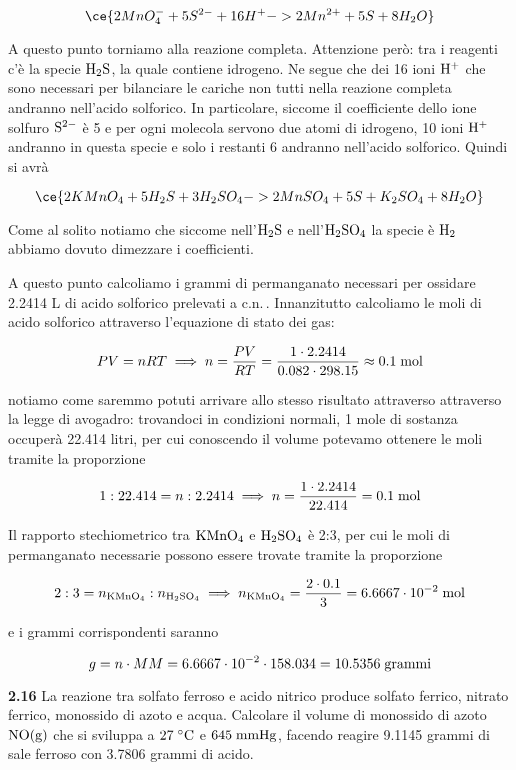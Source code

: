 $$\ce{2MnO_4^- + 5S^{2-} + 16H^+ -> 2Mn^{2+} + 5S + 8H_2O}$$

A questo punto torniamo alla reazione completa. Attenzione però: tra i reagenti c'è la specie $\rm H_2S$, la quale contiene idrogeno. Ne segue che dei 16 ioni $\rm H^+$ che sono necessari per bilanciare le cariche non tutti nella reazione completa andranno nell'acido solforico. In particolare, siccome il coefficiente dello ione solfuro $\rm S^{2-}$ è 5 e per ogni molecola servono due atomi di idrogeno, 10 ioni $\rm H^+$ andranno in questa specie e solo i restanti 6 andranno nell'acido solforico. Quindi si avrà

$$\ce{2KMnO_4 + 5H_2S + 3H_2SO_4 -> 2MnSO_4 + 5S + K_2SO_4 + 8H_2O}$$

Come al solito notiamo che siccome nell'$\rm H_2S$ e nell'$\rm H_2SO_4$ la specie è $\rm H_2$ abbiamo dovuto dimezzare i coefficienti.

A questo punto calcoliamo i grammi di permanganato necessari per ossidare 2.2414 L di acido solforico prelevati a c.n.\,. Innanzitutto calcoliamo le moli di acido solforico attraverso l'equazione di stato dei gas:

$$PV=nRT
\implies
n=\frac{PV}{RT}
=\frac{1 \cdot 2.2414}{0.082 \cdot 298.15}
\approx 0.1 \; \rm mol$$

notiamo come saremmo potuti arrivare allo stesso risultato attraverso attraverso la legge di avogadro: trovandoci in condizioni normali, 1 mole di sostanza occuperà 22.414 litri, per cui conoscendo il volume potevamo ottenere le moli tramite la proporzione

$$1:22.414=n:2.2414
\implies
n=\frac{1 \cdot 2.2414}{22.414}=0.1 \; \rm mol$$

Il rapporto stechiometrico tra $\rm KMnO_4$ e $\rm H_2SO_4$ è 2:3, per cui le moli di permanganato necessarie possono essere trovate tramite la proporzione

$$2:3=n_{\rm KMnO_4}:n_{\rm H_2SO_4}
\implies
n_{\rm KMnO_4}=\frac{2 \cdot 0.1}{3}=6.6667 \cdot 10^{-2} \; \rm mol$$

e i grammi corrispondenti saranno

$$g=n \cdot MM=6.6667 \cdot 10^{-2} \cdot 158.034
=10.5356 \; \rm grammi$$

\vspace{0.2cm}\textbf{2.16} La reazione tra solfato ferroso e acido nitrico produce solfato ferrico, nitrato ferrico, monossido di azoto e acqua. Calcolare il volume di monossido di azoto $\rm NO(g)$ che si sviluppa a $27 \; ^{\circ} \rm C$ e $645 \; \rm mmHg$, facendo reagire 9.1145 grammi di sale ferroso con 3.7806 grammi di acido.

